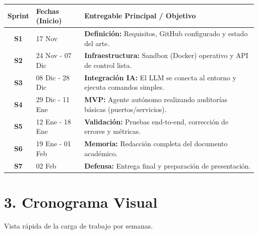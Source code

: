 \documentclass[11pt,a4paper]{article}
\begin{document}
\begin{table}[H]
\centering
\begin{tabular}{|c|l|p{8.5cm}|}
\hline
\rowcolor{headergray} 
\textbf{Sprint} & \textbf{Fechas (Inicio)} & \textbf{Entregable Principal / Objetivo} \\ \hline

\textbf{S1} & 17 Nov & \textbf{Definición:} Requisitos, GitHub configurado y estado del arte. \\ \hline

\textbf{S2} & 24 Nov - 07 Dic & \textbf{Infraestructura:} Sandbox (Docker) operativo y API de control lista. \\ \hline

\textbf{S3} & 08 Dic - 28 Dic & \textbf{Integración IA:} El LLM se conecta al entorno y ejecuta comandos simples. \\ \hline

\textbf{S4} & 29 Dic - 11 Ene & \textbf{MVP:} Agente autónomo realizando auditorías básicas (puertos/servicios). \\ \hline

\textbf{S5} & 12 Ene - 18 Ene & \textbf{Validación:} Pruebas end-to-end, corrección de errores y métricas. \\ \hline

\textbf{S6} & 19 Ene - 01 Feb & \textbf{Memoria:} Redacción completa del documento académico. \\ \hline

\textbf{S7} & 02 Feb & \textbf{Defensa:} Entrega final y preparación de presentación. \\ \hline
\end{tabular}
\end{table}

\section*{3. Cronograma Visual}

Vista rápida de la carga de trabajo por semanas.
\end{document}
